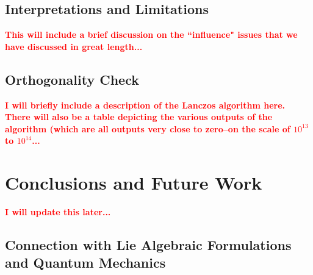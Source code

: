 \documentclass[final,1p,times]{elsarticle}
\newcommand{\no}{\noindent}
\theoremstyle{remark}
\theoremstyle{definition}
\newcommand{\josh}[1]{\textcolor{red}{\textbf{#1}}}
\begin{document}



\subsection{Interpretations and Limitations}

\no\josh{This will include a brief discussion on the ``influence" issues that we have discussed in great length...}

\subsection{Orthogonality Check}

\no\josh{I will briefly include a description of the Lanczos algorithm here. There will also be a table depicting the various outputs of the algorithm (which are all outputs very close to zero--on the scale of $10^{13}$ to $10^{14}$...}

\section{Conclusions and Future Work}

\noindent\josh{I will update this later...}

\subsection{Connection with Lie Algebraic Formulations and Quantum Mechanics}

\end{document}
